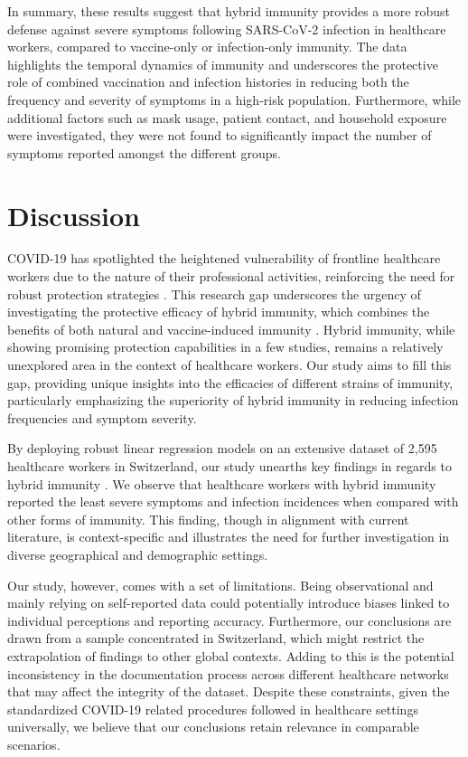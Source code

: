\documentclass[11pt]{article}
\begin{document}
In summary, these results suggest that hybrid immunity provides a more robust defense against severe symptoms following SARS-CoV-2 infection in healthcare workers, compared to vaccine-only or infection-only immunity. The data highlights the temporal dynamics of immunity and underscores the protective role of combined vaccination and infection histories in reducing both the frequency and severity of symptoms in a high-risk population. Furthermore, while additional factors such as mask usage, patient contact, and household exposure were investigated, they were not found to significantly impact the number of symptoms reported amongst the different groups.

\section*{Discussion}

COVID-19 has spotlighted the heightened vulnerability of frontline healthcare workers due to the nature of their professional activities, reinforcing the need for robust protection strategies \cite{Pilishvili2021InterimEO, GmezOchoa2020COVID19IH}. This research gap underscores the urgency of investigating the protective efficacy of hybrid immunity, which combines the benefits of both natural and vaccine-induced immunity \cite{Kellam2020TheDO, Alshekaili2020FactorsAW}. Hybrid immunity, while showing promising protection capabilities in a few studies, remains a relatively unexplored area in the context of healthcare workers. Our study aims to fill this gap, providing unique insights into the efficacies of different strains of immunity, particularly emphasizing the superiority of hybrid immunity in reducing infection frequencies and symptom severity.

By deploying robust linear regression models on an extensive dataset of 2,595 healthcare workers in Switzerland, our study unearths key findings in regards to hybrid immunity \cite{Nordstrm2022RiskOS, Goldberg2021ProtectionAW}. We observe that healthcare workers with hybrid immunity reported the least severe symptoms and infection incidences when compared with other forms of immunity. This finding, though in alignment with current literature, is context-specific and illustrates the need for further investigation in diverse geographical and demographic settings.

Our study, however, comes with a set of limitations. Being observational and mainly relying on self-reported data could potentially introduce biases linked to individual perceptions and reporting accuracy. Furthermore, our conclusions are drawn from a sample concentrated in Switzerland, which might restrict the extrapolation of findings to other global contexts. Adding to this is the potential inconsistency in the documentation process across different healthcare networks that may affect the integrity of the dataset. Despite these constraints, given the standardized COVID-19 related procedures followed in healthcare settings universally, we believe that our conclusions retain relevance in comparable scenarios.
\end{document}
